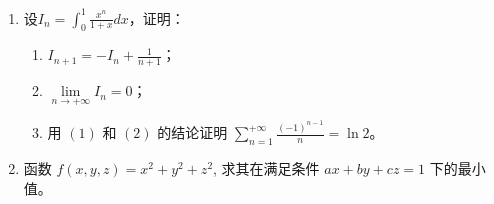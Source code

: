 \begin{enumerate}
\begin{enumerate}
	
	
\end{enumerate}




\item 
设$I_{n}=\int_{0}^{1} \frac{x^{n}}{1+x} d x$，证明：
\begin{enumerate}
	\item %
	$I_{n+1}=-I_{n}+\frac{1}{n+1}$；
	\item 
	$\lim\limits _{n \rightarrow+\infty} I_{n}=0$；
	\item 
	用 $(1)$  和 $(2)$ 的结论证明 $\sum\limits_{n=1}^{+\infty} \frac{(-1)^{n-1}}{n}=\ln 2$。
	
\end{enumerate}






\item 
函数 $f(x, y, z)=x^{2}+y^{2}+z^{2}$, 求其在满足条件 $a x+b y+c z=1$ 下的最小值。

	
\end{enumerate}

